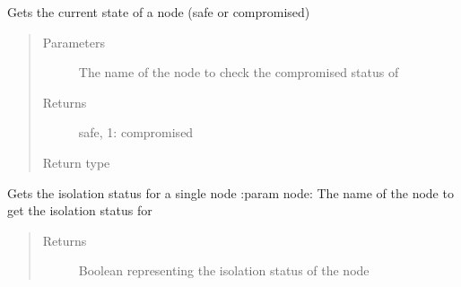 \documentclass[letterpaper,10pt,english]{sphinxmanual}
\begin{document}
\begin{fulllineitems}
\begin{fulllineitems}
\label{\detokenize{source/yawning_titan.envs.generic.core:yawning_titan.envs.generic.core.network_interface.NetworkInterface.get_single_node_blue_view}}
\sphinxAtStartPar
Gets the current state of a node (safe or compromised)
\begin{quote}\begin{description}
\item[{Parameters}] \leavevmode
\sphinxAtStartPar
{} \textendash{} The name of the node to check the compromised status of

\item[{Returns}] \leavevmode
\sphinxAtStartPar
safe, 1: compromised

\item[{Return type}] \leavevmode
{}

\end{description}\end{quote}

\end{fulllineitems}


\begin{fulllineitems}
\label{\detokenize{source/yawning_titan.envs.generic.core:yawning_titan.envs.generic.core.network_interface.NetworkInterface.get_single_node_isolation_status}}
\sphinxAtStartPar
Gets the isolation status for a single node
:param node: The name of the node to get the isolation status for
\begin{quote}\begin{description}
\item[{Returns}] \leavevmode
\sphinxAtStartPar
Boolean representing the isolation status of the node

\end{description}\end{quote}


\end{fulllineitems}
\end{fulllineitems}
\end{document}
